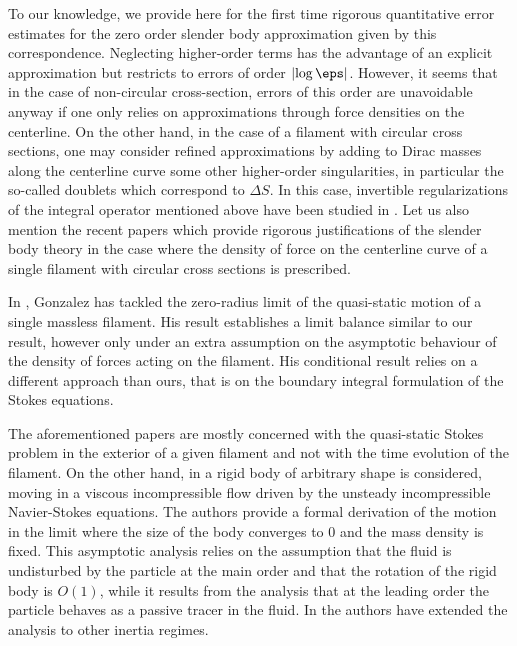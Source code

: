 To our knowledge, we provide here for the first time rigorous quantitative error estimates for the zero order slender body approximation given by this correspondence. Neglecting higher-order terms has the advantage of an explicit approximation but restricts to errors of order $\left|\log \eps\right|$. However, it seems that in the case of non-circular cross-section, errors of this order are unavoidable anyway if one only relies on approximations through force densities on the centerline. On the other hand, in the case of a filament with circular cross sections, one may consider refined approximations by adding to Dirac masses along the centerline curve some other higher-order singularities, in particular the so-called doublets which correspond to $\Delta S$. In this case, invertible regularizations of the integral operator mentioned above
have been studied in \cite{Mori-Ohm,Mori-Ohm-Accuracy}.
Let us also mention the recent papers \cite{Mori-Ohm-Spirn,Mori-Ohm-free-ends}
which provide rigorous justifications of the slender body theory
in the case where the density of force on the centerline curve of a single filament with circular cross sections
is prescribed.

In \cite{Gonzalez}, Gonzalez has tackled the zero-radius limit of the quasi-static motion of a single massless filament. His result establishes a limit balance similar to our result, however only under an extra assumption on the asymptotic behaviour of the density of forces acting on the filament.
His conditional result relies on a different approach than ours, that is on the boundary integral formulation of the Stokes equations.

The aforementioned papers are mostly concerned with the quasi-static Stokes problem in the exterior of a given filament and not with the time evolution of the filament.
On the other hand, in \cite{Junk-Illner} a rigid body of arbitrary shape is considered, moving in a viscous incompressible flow driven by the unsteady incompressible Navier-Stokes equations. The authors provide a formal derivation of the motion in the limit where the size of the body converges to $0$ and the mass density is fixed. This asymptotic analysis relies on the assumption that the fluid is undisturbed by the particle at the main order and that the rotation of the rigid body is $O(1)$, while it results from the analysis that at the leading order the particle behaves as a passive tracer in the fluid.
In \cite{VM} the authors have extended the analysis to other inertia regimes.\enlargethispage{-.5\baselineskip}%

